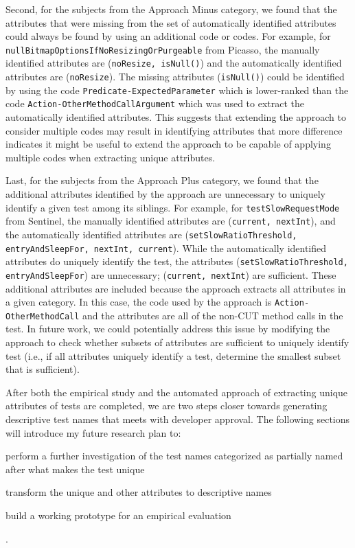 Second, for the subjects from the Approach Minus category, we found that the attributes that were missing from the set of automatically identified attributes could always be found by using an additional code or codes.
For example, for \texttt{null\-Bitmap\-Options\-If\-No\-Resizing\-Or\-Purgeable} from Picasso, the manually identified attributes are (\texttt{no\-Resize, is\-Null()}) and the automatically identified attributes are (\texttt{no\-Resize}).
%
The missing attributes (\texttt{is\-Null()}) could be identified by using the code \texttt{Predicate-Expected\-Parameter} which is lower-ranked than the code \texttt{Action-Other\-Method\-Call\-Argument} which was used to extract the automatically identified attributes.
%
This suggests that extending the approach to consider multiple codes may result in identifying attributes that more difference indicates it might be useful to extend the approach to be capable of applying multiple codes when extracting unique attributes.


Last, for the subjects from the Approach Plus category, we found that the additional attributes identified by the approach are unnecessary to uniquely identify a given test among its siblings.
%
For example, for \texttt{test\-Slow\-Request\-Mode} from Sentinel, the manually identified attributes are (\texttt{current, next\-Int}), and the automatically identified attributes are (\texttt{set\-Slow\-Ratio\-Threshold, entry\-And\-Sleep\-For, next\-Int, current}). 
%
While the automatically identified attributes do uniquely identify the test, the attributes (\texttt{set\-Slow\-Ratio\-Threshold, entry\-And\-Sleep\-For}) are unnecessary; (\texttt{current, next\-Int}) are sufficient.
%
These additional attributes are included because the approach extracts all attributes in a given category.
%
In this case, the code used by the approach is \texttt{Action-Other\-Method\-Call} and the attributes are all of the non-CUT method calls in the test.
%
In future work, we could potentially address this issue by modifying the approach to check whether subsets of attributes are sufficient to uniquely identify test (i.e., if all attributes uniquely identify a test, determine the smallest subset that is sufficient).


After both the empirical study and the automated approach of extracting unique attributes of tests are completed, we are two steps closer towards generating descriptive test names that meets with developer approval.
%
The following sections will introduce my future research plan to:
\begin{enumerate*}
    \item perform a further investigation of the test names categorized as partially named after what makes the test unique
    \item transform the unique and other attributes to descriptive names
    \item build a working prototype for an empirical evaluation 
\end{enumerate*}.

